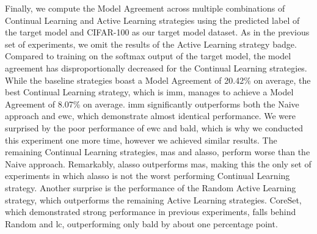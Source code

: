 Finally, we compute the Model Agreement across multiple combinations of Continual Learning and Active Learning strategies using the predicted label of the target model and CIFAR-100 as our target model dataset. As in the previous set of experiments, we omit the results of
the Active Learning strategy \gls{badge}. Compared to training on the softmax output of the target model, the model agreement has disproportionally decreased for the Continual Learning strategies. While the baseline strategies boast a Model Agreement of 20.42\% on average, the
best Continual Learning strategy, which is \gls{imm}, manages to achieve a Model Agreement of 8.07\% on average. \gls{imm} significantly outperforms both the Naive approach and \gls{ewc}, which demonstrate almost identical performance. We were surprised by the poor performance of \gls{ewc} and \gls{bald},
which is why we conducted this experiment one more time, however we achieved similar results. The remaining Continual Learning strategies, \gls{mas} and \gls{alasso}, perform worse than the Naive approach. Remarkably, \gls{alasso} outperforms \gls{mas}, making this the only set of experiments in which
\gls{alasso} is not the worst performing Continual Learning strategy. Another surprise is the performance of the Random Active Learning strategy, which outperforms the remaining Active Learning strategies. CoreSet, which demonstrated strong performance in previous experiments, falls behind
Random and \gls{lc}, outperforming only \gls{bald} by about one percentage point. \par

